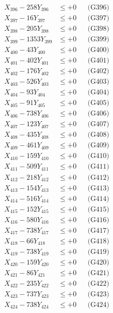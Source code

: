 \documentclass[a4paper,10pt]{article}
\begin{document}
{\begin{align}
X_{396} - 258Y_{396} &\leq +0 && \text{(G396)} \\
X_{397} - 16Y_{397} &\leq +0 && \text{(G397)} \\
X_{398} - 205Y_{398} &\leq +0 && \text{(G398)} \\
X_{399} - 1353Y_{399} &\leq +0 && \text{(G399)} \\
X_{400} - 43Y_{400} &\leq +0 && \text{(G400)} \\
\allowbreak
X_{401} - 402Y_{401} &\leq +0 && \text{(G401)} \\
X_{402} - 176Y_{402} &\leq +0 && \text{(G402)} \\
X_{403} - 526Y_{403} &\leq +0 && \text{(G403)} \\
X_{404} - 93Y_{404} &\leq +0 && \text{(G404)} \\
X_{405} - 91Y_{405} &\leq +0 && \text{(G405)} \\
X_{406} - 738Y_{406} &\leq +0 && \text{(G406)} \\
X_{407} - 123Y_{407} &\leq +0 && \text{(G407)} \\
X_{408} - 435Y_{408} &\leq +0 && \text{(G408)} \\
X_{409} - 461Y_{409} &\leq +0 && \text{(G409)} \\
X_{410} - 159Y_{410} &\leq +0 && \text{(G410)} \\
\allowbreak
X_{411} - 509Y_{411} &\leq +0 && \text{(G411)} \\
X_{412} - 218Y_{412} &\leq +0 && \text{(G412)} \\
X_{413} - 154Y_{413} &\leq +0 && \text{(G413)} \\
X_{414} - 516Y_{414} &\leq +0 && \text{(G414)} \\
X_{415} - 152Y_{415} &\leq +0 && \text{(G415)} \\
X_{416} - 580Y_{416} &\leq +0 && \text{(G416)} \\
X_{417} - 738Y_{417} &\leq +0 && \text{(G417)} \\
X_{418} - 66Y_{418} &\leq +0 && \text{(G418)} \\
X_{419} - 738Y_{419} &\leq +0 && \text{(G419)} \\
X_{420} - 159Y_{420} &\leq +0 && \text{(G420)} \\
\allowbreak
X_{421} - 86Y_{421} &\leq +0 && \text{(G421)} \\
X_{422} - 235Y_{422} &\leq +0 && \text{(G422)} \\
X_{423} - 737Y_{423} &\leq +0 && \text{(G423)} \\
X_{424} - 738Y_{424} &\leq +0 && \text{(G424)} \\

\end{align}}
\end{document}
